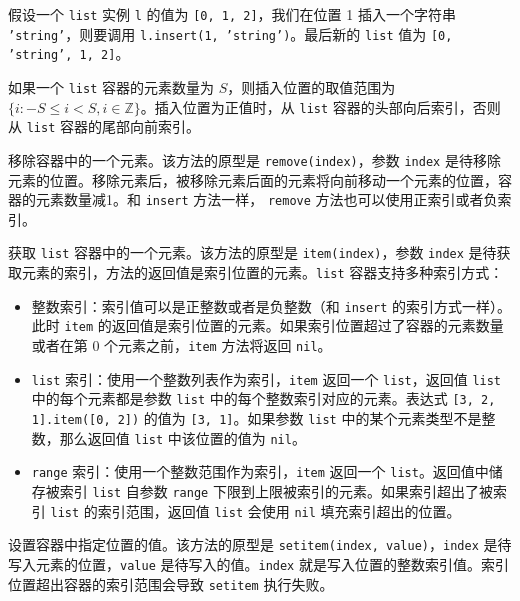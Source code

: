 假设一个 \texttt{list} 实例 \texttt{l} 的值为 \texttt{[0, 1, 2]}，我们在位置 1 插入一个字符串 \texttt{'string'}，则要调用 \texttt{l.insert(1, 'string')}。最后新的 \texttt{list} 值为 \texttt{[0, 'string', 1, 2]}。

如果一个 \texttt{list} 容器的元素数量为 $S$，则插入位置的取值范围为 $\{i: -S\leqslant i<S, i\in\mathbb{Z}\}$。插入位置为正值时，从 \texttt{list} 容器的头部向后索引，否则从 \texttt{list} 容器的尾部向前索引。


移除容器中的一个元素。该方法的原型是 \texttt{remove(index)}，参数 \texttt{index} 是待移除元素的位置。移除元素后，被移除元素后面的元素将向前移动一个元素的位置，容器的元素数量减1。和 \texttt{insert} 方法一样， \texttt{remove} 方法也可以使用正索引或者负索引。


获取 \texttt{list} 容器中的一个元素。该方法的原型是 \texttt{item(index)}，参数 \texttt{index} 是待获取元素的索引，方法的返回值是索引位置的元素。\texttt{list} 容器支持多种索引方式：

\begin{itemize}
    \item 整数索引：索引值可以是正整数或者是负整数（和 \texttt{insert} 的索引方式一样）。此时 \texttt{item} 的返回值是索引位置的元素。如果索引位置超过了容器的元素数量或者在第 0 个元素之前，\texttt{item} 方法将返回 \texttt{nil}。
    \item \texttt{list} 索引：使用一个整数列表作为索引，\texttt{item} 返回一个 \texttt{list}，返回值 \texttt{list} 中的每个元素都是参数 \texttt{list} 中的每个整数索引对应的元素。表达式 \texttt{[3, 2, 1].item([0, 2])} 的值为 \texttt{[3, 1]}。如果参数 \texttt{list} 中的某个元素类型不是整数，那么返回值 \texttt{list} 中该位置的值为 \texttt{nil}。
    \item \texttt{range} 索引：使用一个整数范围作为索引，\texttt{item} 返回一个 \texttt{list}。返回值中储存被索引 \texttt{list} 自参数 \texttt{range} 下限到上限被索引的元素。如果索引超出了被索引 \texttt{list} 的索引范围，返回值 \texttt{list} 会使用 \texttt{nil} 填充索引超出的位置。
\end{itemize}


设置容器中指定位置的值。该方法的原型是 \texttt{setitem(index, value)}，\texttt{index} 是待写入元素的位置，\texttt{value} 是待写入的值。\texttt{index} 就是写入位置的整数索引值。索引位置超出容器的索引范围会导致 \texttt{setitem} 执行失败。

